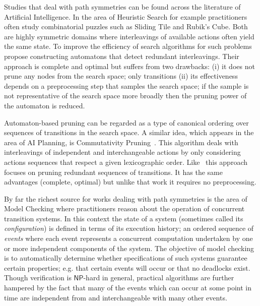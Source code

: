 Studies that deal with path symmetries can be found across the literature of Artificial Intelligence.
In the area of Heuristic Search for example practitioners often study combinatorial puzzles such as Sliding 
Tile and Rubik's Cube. Both are highly symmetric domains where interleavings of available
actions often yield the same state. To improve the efficiency of search algorithms for such problems
~\cite{taylor93} propose constructing automatons that detect redundant interleavings.
Their approach is complete and optimal but suffers from two drawbacks: (i) it does not prune any nodes
from the search space; only transitions (ii) its effectiveness depends on a preprocessing step that
samples the search space; if the sample is not representative of the search space more broadly then
the pruning power of the automaton is reduced.

Automaton-based pruning can be regarded as a type of canonical ordering over sequences of 
transitions in the search space. A similar idea, which appears in the area of AI Planning, is
Commutativity Pruning~\citep{haslum00}. This algorithm deals with interleavings of independent and 
interchangeable actions by only considering actions sequences that respect a given lexicographic 
order. Like~\citep{taylor93} this approach focuses on pruning redundant sequences of transitions.
It has the same advantages (complete, optimal) but unlike that work it requires no preprocessing.

By far the richest source for works dealing with path symmetries is the area of Model Checking
where practitioners reason about the operation of concurrent transition systems.  In this
context the state of a system (sometimes called its \emph{configuration}) is defined in terms of its
execution history; an ordered sequence of \emph{events} where each event represents a concurrent
computation undertaken by one or more independent components of the system.  The objective of model
checking is to automatically determine whether specifications of such systems guarantee certain
properties; e.g.  that certain events will occur or that no deadlocks exist.  Though verification is
$\mathsf{NP}$-hard in general, practical algorithms are further hampered by the fact that many of
the events which can occur at some point in time are independent from and interchangeable with many
other events.

